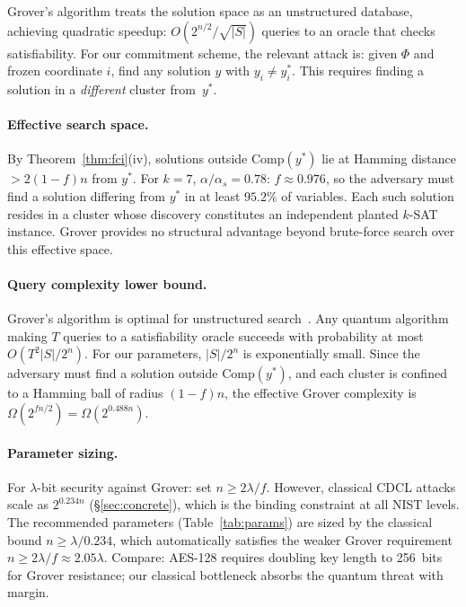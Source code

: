 \documentclass[11pt]{article}
\begin{document}
Grover's algorithm treats the solution space as an unstructured database, achieving quadratic speedup: $O(2^{n/2}/\sqrt{|S|})$ queries to an oracle that checks satisfiability.  For our commitment scheme, the relevant attack is: given $\Phi$ and frozen coordinate $i$, find any solution $y$ with $y_i \neq y^*_i$.  This requires finding a solution in a \emph{different} cluster from~$y^*$.

\paragraph{Effective search space.}
By Theorem~\ref{thm:fci}(iv), solutions outside $\mathrm{Comp}(y^*)$ lie at Hamming distance $> 2(1-f)n$ from $y^*$.  For $k = 7$, $\alpha/\alpha_s = 0.78$: $f \approx 0.976$, so the adversary must find a solution differing from $y^*$ in at least $95.2\%$ of variables.  Each such solution resides in a cluster whose discovery constitutes an independent planted $k$-SAT instance.  Grover provides no structural advantage beyond brute-force search over this effective space.

\paragraph{Query complexity lower bound.}
Grover's algorithm is optimal for unstructured search~\cite{BBBV97,Zal99}.  Any quantum algorithm making $T$ queries to a satisfiability oracle succeeds with probability at most $O(T^2 |S| / 2^n)$.  For our parameters, $|S|/2^n$ is exponentially small.  Since the adversary must find a solution outside $\mathrm{Comp}(y^*)$, and each cluster is confined to a Hamming ball of radius $(1-f)n$, the effective Grover complexity is $\Omega(2^{fn/2}) = \Omega(2^{0.488n})$.

\paragraph{Parameter sizing.}
For $\lambda$-bit security against Grover: set $n \geq 2\lambda/f$.  However, classical CDCL attacks scale as $2^{0.234n}$ (\S\ref{sec:concrete}), which is the binding constraint at all NIST levels.  The recommended parameters (Table~\ref{tab:params}) are sized by the classical bound $n \geq \lambda / 0.234$, which automatically satisfies the weaker Grover requirement $n \geq 2\lambda / f \approx 2.05\lambda$.  Compare: AES-128 requires doubling key length to 256~bits for Grover resistance; our classical bottleneck absorbs the quantum threat with margin.
\end{document}
